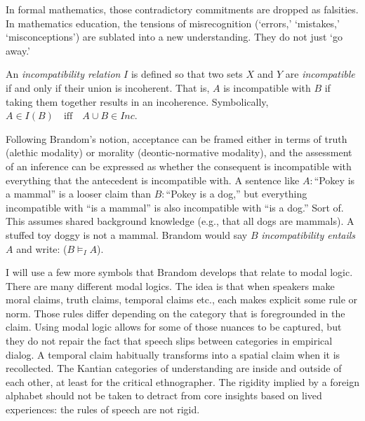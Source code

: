 \documentclass[12pt]{book}
\begin{document}
In formal mathematics, those contradictory commitments are dropped as falsities. In mathematics education, the tensions of misrecognition (`errors,' `mistakes,' `misconceptions') are sublated into a new understanding. They do not just `go away.'

An \textit{incompatibility relation} $I$ is defined so that two sets $X$ and $Y$ are \textit{incompatible} if and only if their union is incoherent. That is, $A$ is incompatible with $B$ if taking them together results in an incoherence. Symbolically, $A \in I(B) \quad \text{iff} \quad A \cup B \in Inc.$


Following Brandom's notion, acceptance can be framed either in terms of truth (alethic modality) or morality (deontic-normative modality), and the assessment of an inference can be expressed as whether the consequent is incompatible with everything that the antecedent is incompatible with. A sentence like $A:$``Pokey is a mammal'' is a looser claim than $B:$``Pokey is a dog,'' but everything incompatible with ``is a mammal'' is also incompatible with ``is a dog.'' Sort of. This assumes shared background knowledge (e.g., that all dogs are mammals). A stuffed toy doggy is not a mammal. Brandom would say $B$ \textit{incompatibility entails} $A$ and write: ($B \models_I A$). 

I will use a few more symbols that Brandom develops that relate to modal logic. There are many different modal logics. The idea is that when speakers make moral claims, truth claims, temporal claims etc., each makes explicit some rule or norm. Those rules differ depending on the category that is foregrounded in the claim. Using modal logic allows for some of those nuances to be captured, but they do not repair the fact that speech slips between categories in empirical dialog. A temporal claim habitually transforms into a spatial claim when it is recollected. The Kantian categories of understanding are inside and outside of each other, at least for the critical ethnographer. The rigidity implied by a foreign alphabet should not be taken to detract from core insights based on lived experiences: the rules of speech are not rigid.
\end{document}
